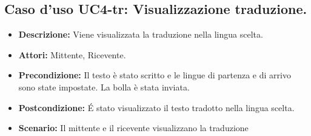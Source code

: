 \subsection{Caso d'uso UC4-tr: Visualizzazione traduzione.}
\begin{itemize}
\item[]\textbf{Descrizione:} Viene visualizzata la traduzione nella lingua scelta.
\item[]\textbf{Attori:} Mittente, Ricevente. 
\item[]\textbf{Precondizione:} Il testo è stato scritto e le lingue di partenza e di arrivo sono state impostate. La bolla è stata inviata. 
\item[]\textbf{Postcondizione:} \'E stato visualizzato il testo tradotto nella lingua scelta. 
\item[]\textbf{Scenario:}
Il mittente e il ricevente visualizzano la traduzione 
\end{itemize}

